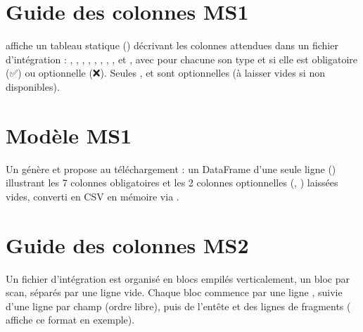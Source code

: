 \documentclass[letterpaper,10pt,english]{sphinxmanual}
\begin{document}
\section{Guide des colonnes MS1}
\label{\detokenize{4_Resources:guide-des-colonnes-ms1}}
\sphinxAtStartPar
{} affiche un tableau statique () décrivant les
colonnes attendues dans un fichier d’intégration  : ,
, , , ,
, , ,  et ,
avec pour chacune son type et si elle est obligatoire (✅) ou optionnelle (❌).
Seules ,  et  sont optionnelles (à laisser
vides si non disponibles).


\section{Modèle MS1}
\label{\detokenize{4_Resources:modele-ms1}}
\sphinxAtStartPar
Un  génère et propose au téléchargement
 : un DataFrame d’une seule ligne ()
illustrant les 7 colonnes obligatoires et les 2 colonnes optionnelles
(, ) laissées vides, converti en CSV en mémoire via
.


\section{Guide des colonnes MS2}
\label{\detokenize{4_Resources:guide-des-colonnes-ms2}}
\sphinxAtStartPar
Un fichier d’intégration  est organisé en blocs empilés verticalement,
un bloc par scan, séparés par une ligne vide. Chaque bloc commence par une
ligne , suivie d’une ligne  par champ (ordre
libre), puis de l’en\sphinxhyphen{}tête  et des lignes de fragments
( affiche ce format en exemple).
\end{document}
